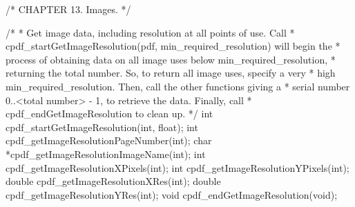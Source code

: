 /* CHAPTER 13. Images. */

/*
 * Get image data, including resolution at all points of use. Call
 * cpdf_startGetImageResolution(pdf, min_required_resolution) will begin the
 * process of obtaining data on all image uses below min_required_resolution,
 * returning the total number. So, to return all image uses, specify a very
 * high min_required_resolution. Then, call the other functions giving a
 * serial number 0..<total number> - 1, to retrieve the data. Finally, call
 * cpdf_endGetImageResolution to clean up.
 */
int cpdf_startGetImageResolution(int, float);
int cpdf_getImageResolutionPageNumber(int);
char *cpdf_getImageResolutionImageName(int);
int cpdf_getImageResolutionXPixels(int);
int cpdf_getImageResolutionYPixels(int);
double cpdf_getImageResolutionXRes(int);
double cpdf_getImageResolutionYRes(int);
void cpdf_endGetImageResolution(void);

